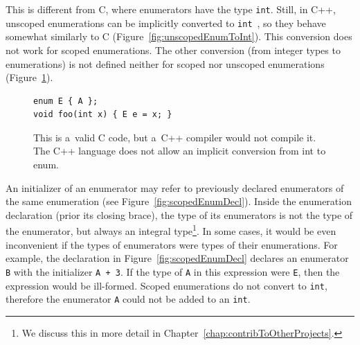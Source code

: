 \documentclass[nolot,nolof,nocover,printed]{fithesis3}
\newcommand{\stdN}[2]{\cite[#2]{#1}\xspace}
\begin{document}
This is different from C, where enumerators have the type \lstinline|int|. Still, in C++, unscoped enumerations can be implicitly converted to \lstinline|int|~\stdN{n4296}{\S 7.2/10}, so they behave somewhat similarly to C (Figure~\ref{fig:unscopedEnumToInt}). This conversion does not work for scoped enumerations. The other conversion (from integer types to enumerations) is not defined neither for scoped nor unscoped enumerations (Figure~\ref{fig:noConversionFromIntToEnum}).

\begin{figure}
\begin{lstlisting}
enum E { A };
void foo(int x) { E e = x; }
\end{lstlisting}
\caption{This is a~valid C code, but a~C++ compiler would not compile it. The C++ language does not allow an implicit conversion from int to enum. }
\label{fig:noConversionFromIntToEnum}
\end{figure}

An initializer of an enumerator may refer to previously declared enumerators of the same enumeration (see Figure~\ref{fig:scopedEnumDecl}). Inside the enumeration declaration (prior its closing brace), the type of its enumerators is not the type of the enumerator, but always an integral type\footnote{We discuss this in more detail in Chapter~\ref{chap:contribToOtherProjects}.}.
In some cases, it would be even inconvenient if the types of enumerators were types of their enumerations. For example, the declaration in Figure~\ref{fig:scopedEnumDecl} declares an enumerator \lstinline|B| with the initializer \lstinline|A + 3|. If the type of \lstinline|A| in this expression were \lstinline|E|, then the expression would be ill-formed. Scoped enumerations do not convert to \lstinline|int|, therefore the enumerator \lstinline|A| could not be added to an \lstinline|int|.

%
%
\end{document}
